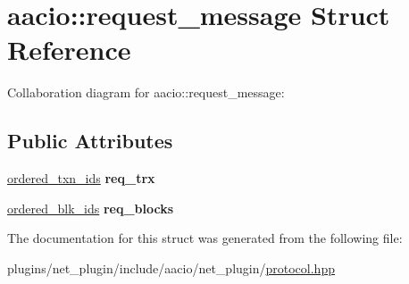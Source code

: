 \hypertarget{structaacio_1_1request__message}{}\section{aacio\+:\+:request\+\_\+message Struct Reference}
\label{structaacio_1_1request__message}


Collaboration diagram for aacio\+:\+:request\+\_\+message\+:
\subsection*{Public Attributes}
\begin{DoxyCompactItemize}
\item 
\mbox{\label{structaacio_1_1request__message_a49fbe815961a9e347ec2d026e13c0951}} 
\mbox{\hyperlink{structaacio_1_1select__ids}{ordered\+\_\+txn\+\_\+ids}} {\bfseries req\+\_\+trx}
\item 
\mbox{\label{structaacio_1_1request__message_a222534e595ea044ee8a442ca7cd8f134}} 
\mbox{\hyperlink{structaacio_1_1select__ids}{ordered\+\_\+blk\+\_\+ids}} {\bfseries req\+\_\+blocks}
\end{DoxyCompactItemize}


The documentation for this struct was generated from the following file\+:\begin{DoxyCompactItemize}
\item 
plugins/net\+\_\+plugin/include/aacio/net\+\_\+plugin/\mbox{\hyperlink{plugins_2net__plugin_2include_2aacio_2net__plugin_2protocol_8hpp}{protocol.\+hpp}}\end{DoxyCompactItemize}
